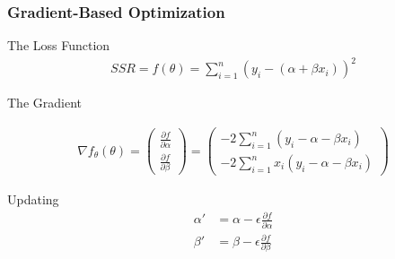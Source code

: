 \documentclass[
  shownotes,
  xcolor={svgnames},
  hyperref={colorlinks,citecolor=DarkBlue,linkcolor=DarkRed,urlcolor=DarkBlue}
  , aspectratio=169]{beamer}
\begin{document}
\begin{frame}[fragile]
\frametitle{Gradient-Based Optimization}






The Loss Function         
\begin{align}
SSR=f(\theta)=\sum_{i=1}^{n}(y_{i}-(\alpha+\beta x_{i}))^{2} \nonumber
\end{align}

The Gradient

\begin{align}
\nabla f_{\theta}(\theta)=\left(\begin{array}{c}
\frac{\partial f}{\partial\alpha}\\
\frac{\partial f}{\partial\beta}
\end{array}\right)=\left(\begin{array}{c}
-2\sum_{i=1}^{n}(y_{i}-\alpha-\beta x_{i})\\
-2\sum_{i=1}^{n}x_{i}(y_{i}-\alpha-\beta x_{i})
\end{array}\right)  \nonumber
\end{align}

Updating
\begin{align}
\alpha' &=\alpha-\epsilon\frac{\partial f}{\partial\alpha} \nonumber \\
\beta' &= \beta-\epsilon\frac{\partial f}{\partial\beta} \nonumber
\end{align}

\end{frame}
\end{document}
